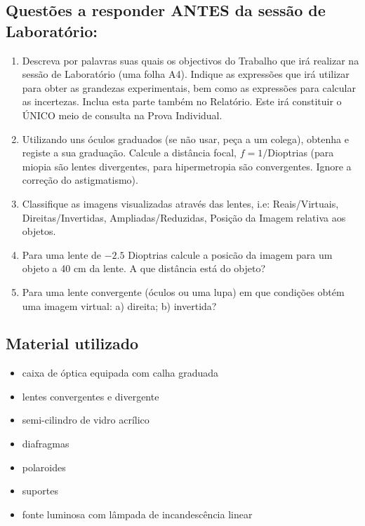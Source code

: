 \documentclass[a4paper,12pt]{article}      %
\begin{document}
\subsection{\sf Questões a responder ANTES da sessão de Laboratório:}
\begin{enumerate}
\item Descreva por palavras suas quais os objectivos do Trabalho que irá realizar na sessão de Laboratório (uma folha A4). Indique as expressões que irá utilizar para obter as grandezas experimentais, bem como as expressões para calcular as incertezas. Inclua esta parte também no Relatório. Este irá constituir o ÚNICO meio de consulta na Prova Individual.
	
\item Utilizando uns óculos graduados (se não usar, peça a um colega), obtenha e registe a sua graduação. Calcule a distância focal, $f=1/$Dioptrias (para miopia são lentes divergentes, para hipermetropia são convergentes. Ignore  a correção do astigmatismo).
\item Classifique as imagens visualizadas através das lentes, i.e: Reais/Virtuais, Direitas/Invertidas, Ampliadas/Reduzidas, Posição da Imagem relativa aos objetos.
\item Para uma lente de $-2.5$ Dioptrias calcule a posicão da imagem para um objeto a 40 cm da lente. A que distância está do objeto?
\item Para uma lente convergente (óculos ou uma lupa) em que condições obtém uma imagem virtual: a) direita; b) invertida?
\end{enumerate}

\subsection{\sf Material utilizado}
\begin{itemize}
\item caixa de óptica equipada com calha graduada
\item lentes convergentes e divergente
\item semi-cilindro de vidro acrílico
\item diafragmas
\item polaroides
\item suportes
\item fonte luminosa com lâmpada de incandescência linear
\end{itemize}


\end{document}
